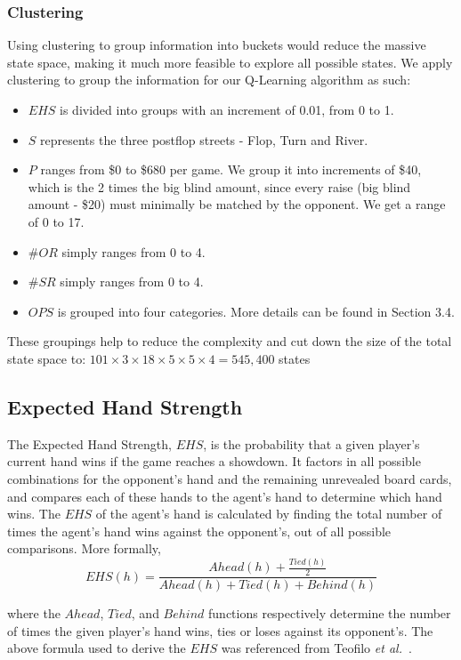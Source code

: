 \documentclass{article}
\begin{document}
\subsubsection{Clustering}

Using clustering to group information into buckets would reduce the massive state space, making it much more feasible to explore all possible states. We apply clustering to group the information for our Q-Learning algorithm as such:
\begin{itemize}
  \item $EHS$ is divided into groups with an increment of 0.01, from 0 to 1.
  \item $S$ represents the three postflop streets - Flop, Turn and River.
  \item $P$ ranges from \$0 to \$680 per game. We group it into increments of \$40, which is the 2 times the big blind amount, since every raise (big blind amount - \$20) must minimally be matched by the opponent. We get a range of 0 to 17.
  \item $\#OR$ simply ranges from 0 to 4.
  \item $\#SR$ simply ranges from 0 to 4.
  \item $OPS$ is grouped into four categories. More details can be found in Section 3.4.
\end{itemize}

These groupings help to reduce the complexity and cut down the size of the total state space to: $101 \times 3 \times 18 \times 5 \times 5 \times 4 = 545,400$ states


\subsection{Expected Hand Strength}

The Expected Hand Strength, $EHS$, is the probability that a given player's current hand wins if the game reaches a showdown. It factors in all possible combinations for the opponent's hand and the remaining unrevealed board cards, and compares each of these hands to the agent's hand to determine which hand wins. The $EHS$ of the agent's hand is calculated by finding the total number of times the agent's hand wins against the opponent's, out of all possible comparisons. More formally,
\begin{displaymath}
  EHS(h)= \frac{Ahead(h)+\frac{Tied(h)}{2}}{Ahead(h) + Tied(h) + Behind(h)}
\end{displaymath}

\noindent where the $Ahead$, $Tied$, and $Behind$ functions respectively determine the number of times the given player's hand wins, ties or loses against its opponent's. The above formula used to derive the $EHS$ was referenced from Teofilo \textit{et al.}~. 
\end{document}
